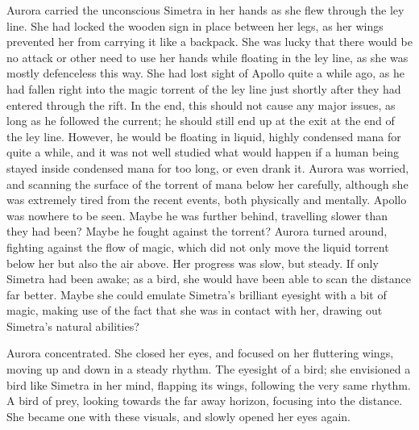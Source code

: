 \froufrou{}

Aurora carried the unconscious Simetra in her hands as she flew through the ley line. She had locked the wooden sign in place between her legs, as her wings prevented her from carrying it like a backpack. She was lucky that there would be no attack or other need to use her hands while floating in the ley line, as she was mostly defenceless this way. She had lost sight of Apollo quite a while ago, as he had fallen right into the magic torrent of the ley line just shortly after they had entered through the rift. In the end, this should not cause any major issues, as long as he followed the current; he should still end up at the exit at the end of the ley line. However, he would be floating in liquid, highly condensed mana for quite a while, and it was not well studied what would happen if a human being stayed inside condensed mana for too long, or even drank it. Aurora was worried, and scanning the surface of the torrent of mana below her carefully, although she was extremely tired from the recent events, both physically and mentally. Apollo was nowhere to be seen. Maybe he was further behind, travelling slower than they had been? Maybe he fought against the torrent? Aurora turned around, fighting against the flow of magic, which did not only move the liquid torrent below her but also the air above. Her progress was slow, but steady. If only Simetra had been awake; as a bird, she would have been able to scan the distance far better. Maybe she could emulate Simetra's brilliant eyesight with a bit of magic, making use of the fact that she was in contact with her, drawing out Simetra's natural abilities? 

Aurora concentrated. She closed her eyes, and focused on her fluttering wings, moving up and down in a steady rhythm. The eyesight of a bird; she envisioned a bird like Simetra in her mind, flapping its wings, following the very same rhythm. A bird of prey, looking towards the far away horizon, focusing into the distance. She became one with these visuals, and slowly opened her eyes again.

